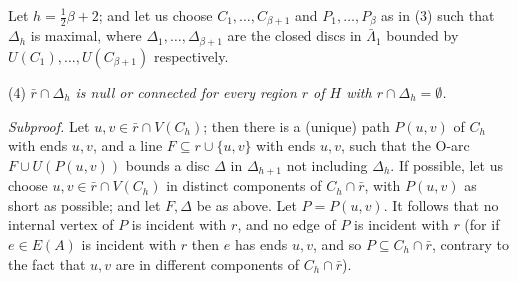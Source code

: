 Let $h = \frac{1}{2}\beta + 2$; and let us choose $C_1, \dots, C_{\beta + 1}$ and $P_1, \dots, P_\beta$ as in (3) such that $\Delta_h$ is maximal, where $\Delta_1, \dots, \Delta_{\beta + 1}$ are the closed discs in $\bar{\Lambda}_1$ bounded by $U(C_1), \dots, U(C_{\beta + 1})$ respectively.

\hspace*{12pt}(4) \textit{$\bar{r} \cap \Delta_h$ is null or connected for every region $r$ of $H$ with $r \cap \Delta_h = \emptyset$.}

\textit{Subproof.} Let $u, v \in \bar{r} \cap V(C_h)$; then there is a (unique) path $P(u, v)$ of $C_h$ with ends $u, v$, and a line $F \subseteq r \cup \{u, v\}$ with ends $u, v$, such that the O-arc $F \cup U(P(u, v))$ bounds a disc $\Delta$ in $\Delta_{h+1}$ not including $\Delta_h$. If possible, let us choose $u, v \in \bar{r} \cap V(C_h)$ in distinct components of $C_h \cap \bar{r}$, with $P(u, v)$ as short as possible; and let $F, \Delta$ be as above. Let $P = P(u, v)$. It follows that no internal vertex of $P$ is incident with $r$, and no edge of $P$ is incident with $r$ (for if $e \in E(A)$ is incident with $r$ then $e$ has ends $u, v$, and so $P \subseteq C_h \cap \bar{r}$, contrary to the fact that $u, v$ are in different components of $C_h \cap \bar{r}$).
